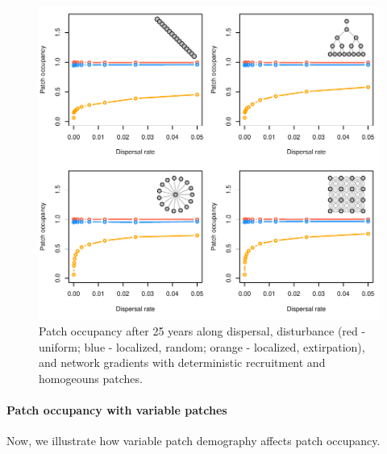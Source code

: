 \documentclass[]{article}
\let\oldparagraph\paragraph
\renewcommand{\paragraph}[1]{\oldparagraph{#1}\mbox{}}
\begin{document}
\begin{figure}[H]

{\centering \includegraphics{Managing_for_ecological_surprises_in_metapopulations_files/figure-latex/patch occupancy-1} 

}

\caption{Patch occupancy after 25 years along dispersal, disturbance (red - uniform; blue - localized, random; orange - localized, extirpation), and network gradients with deterministic recruitment and homogeouns patches.}\label{fig:patch occupancy}
\end{figure}
\newpage

\hypertarget{patch-occupancy-with-variable-patches}{%
\paragraph{Patch occupancy with variable
patches}\label{patch-occupancy-with-variable-patches}}

Now, we illustrate how variable patch demography affects patch
occupancy.
\end{document}
